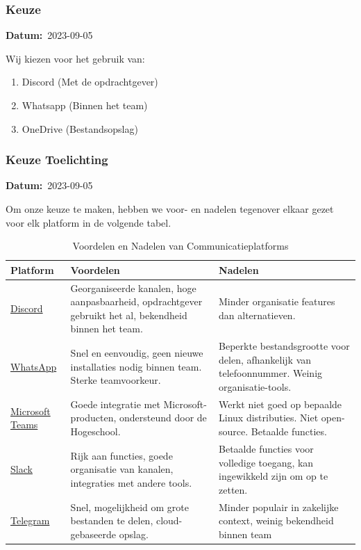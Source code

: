 \documentclass[a4paper]{report}
\newcommand{\timestamp}[1]{
  \mbox{\scriptsize \textbf{Datum:} #1} \smallbreak
}
\begin{document}
\subsubsection{Keuze}
\timestamp{2023-09-05}
Wij kiezen voor het gebruik van:
\begin{enumerate}
  \item Discord (Met de opdrachtgever)
  \item Whatsapp (Binnen het team)
  \item OneDrive (Bestandsopslag)
\end{enumerate}

\subsubsection{Keuze Toelichting}
\timestamp{2023-09-05}
Om onze keuze te maken, hebben we voor- en nadelen tegenover elkaar gezet voor elk platform in de volgende tabel.
\begin{table}[H]
  \centering
  \begin{tabular}{|l|p{6cm}|p{6cm}|}
    \hline
    \textbf{Platform} & \textbf{Voordelen} & \textbf{Nadelen} \\
    \hline
    \href{https://discord.com/}{Discord} & Georganiseerde kanalen, hoge aanpasbaarheid, opdrachtgever gebruikt het al, bekendheid binnen het team. & Minder organisatie features dan alternatieven. \\
    \hline
    \href{https://www.whatsapp.com/}{WhatsApp} & Snel en eenvoudig, geen nieuwe installaties nodig binnen team. Sterke teamvoorkeur. & Beperkte bestandsgrootte voor delen, afhankelijk van telefoonnummer. Weinig organisatie-tools. \\
    \hline
    \href{https://www.microsoft.com/en-us/microsoft-teams/group-chat-software}{Microsoft Teams} & Goede integratie met Microsoft-producten, ondersteund door de Hogeschool. & Werkt niet goed op bepaalde Linux distributies. Niet open-source. Betaalde functies. \\
    \hline
    \href{https://slack.com/}{Slack} & Rijk aan functies, goede organisatie van kanalen, integraties met andere tools. & Betaalde functies voor volledige toegang, kan ingewikkeld zijn om op te zetten. \\
    \hline
    \href{https://telegram.org/}{Telegram} & Snel, mogelijkheid om grote bestanden te delen, cloud-gebaseerde opslag. & Minder populair in zakelijke context, weinig bekendheid binnen team \\
    \hline
  \end{tabular}
  \caption{Voordelen en Nadelen van Communicatieplatforms}
  \label{tab:comm_pros_cons}
\end{table}
\end{document}
